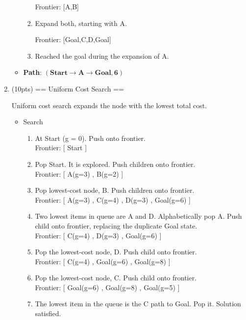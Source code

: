 \documentclass[fleqn]{hermans-hw}
\begin{document}
\begin{enumerate}
\begin{itemize}
\begin{enumerate}
		Frontier: [A,B]
		
		\item Expand both, starting with A.
		
		Frontier: [Goal,C,D,Goal]
		
		\item Reached the goal during the expansion of A.
		
	\end{enumerate}
	\item \textbf{Path}: $\mathbf{(Start \rightarrow A \rightarrow Goal, 6)}$
\end{itemize}

\item (10pts) == Uniform Cost Search ==

Uniform cost search expands the node with the lowest total cost.

\begin{itemize}
	\item Search
	\begin{enumerate}
		\item At Start (g = 0). Push onto frontier. \\
		Frontier: [ Start ]
		
		\item Pop Start.  It is explored.  Push children onto frontier.\\
		Frontier: [ A(g=3) , B(g=2) ]
		
		\item Pop lowest-cost node, B. Push children onto frontier.\\
		Frontier: [ A(g=3) , C(g=4) , D(g=3) , Goal(g=6) ]
		
		\item Two lowest items in queue are A and D. Alphabetically pop A. Push child onto frontier, replacing the duplicate Goal state. \\
		Frontier: [ C(g=4) , D(g=3) , Goal(g=6) ]
		
		\item Pop the lowest-cost node, D. Push child onto frontier. \\
		Frontier: [ C(g=4) , Goal(g=6) , Goal(g=8) ]
		
		\item Pop the lowest-cost node, C. Push child onto frontier.\\
		Frontier: [ Goal(g=6) , Goal(g=8) , Goal(g=5) ]
		
		\item The lowest item in the queue is the C path to Goal. Pop it. Solution satisfied.
		

\end{enumerate}
\end{itemize}
\end{enumerate}
\end{document}
